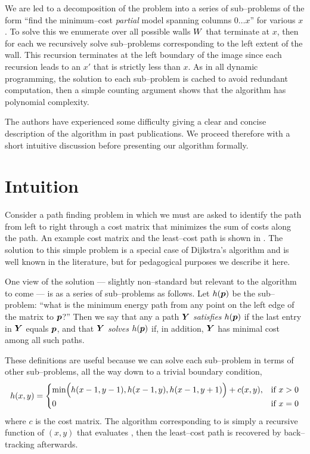 We are led to a decomposition of the problem into a series of
sub--problems of the form ``find the minimum--cost \textit{partial}
model spanning columns $0 \ldots x$'' for various $x$. To solve this
we enumerate over all possible walls $\Wall$ that terminate at $x$,
then for each we recursively solve sub--problems corresponding to the
left extent of the wall. This recursion terminates at the left
boundary of the image since each recursion leads to an $x'$ that is
strictly less than $x$. As in all dynamic programming, the solution to
each sub--problem is cached to avoid redundant computation, then a
simple counting argument shows that the algorithm has polynomial
complexity.

The authors have experienced some difficulty giving a clear and
concise description of the algorithm in past publications. We proceed
therefore with a short intuitive discussion before presenting our
algorithm formally.

\section{Intuition}

Consider a path finding problem in which we must are asked to identify
the path from left to right through a cost matrix that minimizes the
sum of costs along the path. An example cost matrix and the
least--cost path is shown in . The solution to
this simple problem is a special case of Dijkstra's algorithm and is
well known in the literature, but for pedagogical purposes we describe
it here.

One view of the solution --- slightly non--standard but relevant to
the algorithm to come --- is as a series of sub--problems as
follows. Let $h(\Pixel)$ be the sub--problem: ``what is the minimum
energy path from any point on the left edge of the matrix to
$\Pixel$?'' Then we say that any a path $\vect{Y}$ \textit{satisfies}
$h(\Pixel)$ if the last entry in $\vect{Y}$ equals $\Pixel$, and that
$\vect{Y}$ \textit{solves} $h(\Pixel)$ if, in addition, $\vect{Y}$ has
minimal cost among all such paths.

These definitions are useful because we can solve each sub--problem in
terms of other sub--problems, all the way down to a trivial boundary
condition,
\begin{equation}
  \label{eq:seam-carving}
  h(x,y) = 
  \begin{cases}
    \min \Bigl(
      h(x-1,y-1),
      h(x-1,y),
      h(x-1,y+1)
    \Bigr) + c(x,y),
    & \mbox{if } x>0 \\
    0 & \mbox{if } x=0
  \end{cases}
\end{equation}
where $c$ is the cost matrix. The algorithm corresponding to
 is simply a recursive function of $(x,y)$ that
evaluates , then the least--cost path is
recovered by back--tracking afterwards.

